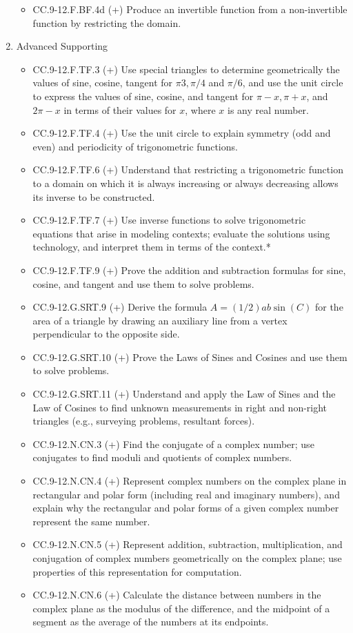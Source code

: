 \documentclass{article}
\begin{document}
\begin{enumerate}
	\begin{itemize}
		\item CC.9-12.F.BF.4d (+) Produce an invertible function from a non-invertible function by restricting the domain.
	\end{itemize}
	\item Advanced Supporting
	\begin{itemize}
		\item CC.9-12.F.TF.3 (+)  Use special triangles to determine geometrically the values of sine, cosine, tangent for $\pi3, \pi/4$ and $\pi/6$, and use the unit circle to express the values of sine, cosine, and tangent for $\pi - x, \pi + x$, and $2\pi - x$ in terms of their values for $x$, where $x$ is any real number.
		\item CC.9-12.F.TF.4 (+)  Use the unit circle to explain symmetry (odd and even) and periodicity of trigonometric functions.
		\item CC.9-12.F.TF.6 (+)  Understand that restricting a trigonometric function to a domain on which it is always increasing or always decreasing allows its inverse to be constructed.
		\item CC.9-12.F.TF.7 (+) Use inverse functions to solve trigonometric equations that arise in modeling contexts; evaluate the solutions using technology, and interpret them in terms of the context.*
		\item CC.9-12.F.TF.9 (+)  Prove the addition and subtraction formulas for sine, cosine, and tangent and use them to solve problems.
		\item CC.9-12.G.SRT.9 (+)   Derive the formula $A = (1/2)ab \sin(C)$ for the area of a triangle by drawing an auxiliary line from a vertex perpendicular to the opposite side.
		\item CC.9-12.G.SRT.10 (+) Prove the Laws of Sines and Cosines and use them to solve problems.
		\item CC.9-12.G.SRT.11 (+)  Understand and apply the Law of Sines and the Law of Cosines to find unknown measurements in right and non-right triangles (e.g., surveying problems, resultant forces).
		\item CC.9-12.N.CN.3 (+)  Find the conjugate of a complex number; use conjugates to find moduli and quotients of complex numbers.
		\item CC.9-12.N.CN.4 (+) Represent complex numbers on the complex plane in rectangular and polar form (including real and imaginary numbers), and explain why the rectangular and polar forms of a given complex number represent the same number.
		\item CC.9-12.N.CN.5 (+) Represent addition, subtraction, multiplication, and conjugation of complex numbers geometrically on the complex plane; use properties of this representation for computation. 
		\item CC.9-12.N.CN.6 (+)  Calculate the distance between numbers in the complex plane as the modulus of the difference, and the midpoint of a segment as the average of the numbers at its endpoints.
	\end{itemize}
\end{enumerate}
\newpage
\end{document}
